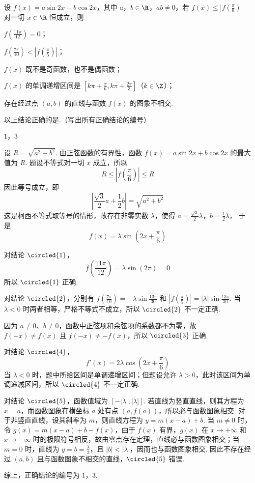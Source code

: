 \begin{problem}
设 \(f(x) = a\sin 2x + b\cos 2x\)，其中 \(a\)，\(b \in \R\)，\(ab \neq 0\)，若 \(f(x) \leqslant \left|f\left(\frac{\pi}{6}\right)\right|\) 对一切 \(x \in \R\) 恒成立，则
\begin{circlelist}
\item \(f\left(\frac{11\pi}{12}\right) = 0\)；
\item \(f\left(\frac{7\pi}{10}\right) < \left|f\left(\frac{\pi}{5}\right)\right|\)；
\item \(f(x)\) 既不是奇函数，也不是偶函数；
\item \(f(x)\) 的单调递增区间是 \(\left[k\pi + \frac{\pi}{6}, k\pi + \frac{2\pi}{3}\right]\)（\(k \in \Z\)）；
\item 存在经过点 \((a, b)\) 的直线与函数 \(f(x)\) 的图象不相交.
\end{circlelist}
以上结论正确的是\fillinblank{}.（写出所有正确结论的编号）
\end{problem}

\begin{answer}
\(1\)，\(3\)
\end{answer}

\begin{solution}
设 \(R=\sqrt{a^{2}+b^{2}}\). 由正弦函数的有界性，函数 \(f(x)=a\sin2x+b\cos2x\) 的最大值为 \(R\). 题设不等式对一切 \(x\) 成立，所以
\[
R\leqslant\left|f\left(\frac{\pi}{6}\right)\right|\leqslant R
\]
因此等号成立，即
\[
\left|\frac{\sqrt3}{2}a+\frac12b\right|=\sqrt{a^{2}+b^{2}}
\]
这是柯西不等式取等号的情形，故存在非零实数 \(\lambda\)，使得
\(a=\frac{\sqrt3}{2}\lambda\)，\(b=\frac12\lambda\)，
于是
\[
f(x)=\lambda\sin\left(2x+\frac{\pi}{6}\right)
\]

对结论 \(\circled{1}\)，
\[
f\left(\frac{11\pi}{12}\right)=\lambda\sin\left(2\pi\right)=0
\]
所以 \(\circled{1}\) 正确.

对结论 \(\circled{2}\)，分别有 \(f\left(\frac{7\pi}{10}\right)=-\lambda\sin\frac{13\pi}{30}\) 和 \(\left|f\left(\frac{\pi}{5}\right)\right|=|\lambda|\sin\frac{13\pi}{30}\).
当 \(\lambda<0\) 时两者相等，严格不等式不成立，所以 \(\circled{2}\) 不一定正确.

因为 \(a\ne0\)、\(b\ne0\)，函数中正弦项和余弦项的系数都不为零，故 \(f(-x)\ne f(x)\) 且 \(f(-x)\ne-f(x)\)，所以 \(\circled{3}\) 正确.

对结论 \(\circled{4}\)，
\[
f'(x)=2\lambda\cos\left(2x+\frac{\pi}{6}\right)
\]
当 \(\lambda<0\) 时，题中所给区间是单调递增区间；但题设允许 \(\lambda>0\)，此时该区间为单调递减区间，所以 \(\circled{4}\) 不一定正确.

对结论 \(\circled{5}\)，函数值域为 \([-|\lambda|,|\lambda|]\). 若直线为竖直直线，则其方程为 \(x=a\)，而函数图象在横坐标 \(a\) 处有点 \((a,f(a))\)，所以必与函数图象相交. 对于非竖直直线，设其斜率为 \(m\)，则直线方程为 \(y=m(x-a)+b\). 当 \(m\ne0\) 时，令 \(g(x)=m(x-a)+b-f(x)\)，由于 \(f(x)\) 有界，\(g(x)\) 在 \(x\to+\infty\) 和 \(x\to-\infty\) 时的极限符号相反，故由零点存在定理，直线必与函数图象相交；当 \(m=0\) 时，直线为 \(y=b=\frac{\lambda}{2}\)，且 \(|b|<|\lambda|\)，因而也与函数图象相交. 因此不存在经过 \((a,b)\) 且与函数图象不相交的直线，\(\circled{5}\) 错误.

综上，正确结论的编号为 \(1\)，\(3\).
\end{solution}

